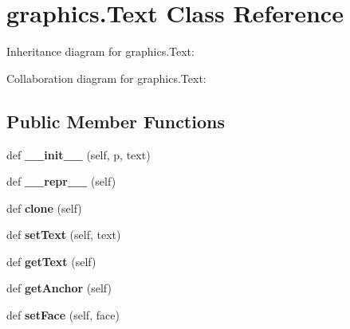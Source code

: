 \hypertarget{classgraphics_1_1Text}{}\section{graphics.\+Text Class Reference}
\label{classgraphics_1_1Text}


Inheritance diagram for graphics.\+Text\+:


Collaboration diagram for graphics.\+Text\+:
\subsection*{Public Member Functions}
\begin{DoxyCompactItemize}
\item 
def {\bfseries \+\_\+\+\_\+init\+\_\+\+\_\+} (self, p, text)\hypertarget{classgraphics_1_1Text_af17676ed39bcc03a78098b22a15ef591}{}\label{classgraphics_1_1Text_af17676ed39bcc03a78098b22a15ef591}

\item 
def {\bfseries \+\_\+\+\_\+repr\+\_\+\+\_\+} (self)\hypertarget{classgraphics_1_1Text_ae0b4ff4a08c45410d4f424a48a6eba59}{}\label{classgraphics_1_1Text_ae0b4ff4a08c45410d4f424a48a6eba59}

\item 
def {\bfseries clone} (self)\hypertarget{classgraphics_1_1Text_a507a4eea3a7a7de19bfe30ff70cf8fd6}{}\label{classgraphics_1_1Text_a507a4eea3a7a7de19bfe30ff70cf8fd6}

\item 
def {\bfseries set\+Text} (self, text)\hypertarget{classgraphics_1_1Text_ab8a97b69fe919acb98429b7da81b7d37}{}\label{classgraphics_1_1Text_ab8a97b69fe919acb98429b7da81b7d37}

\item 
def {\bfseries get\+Text} (self)\hypertarget{classgraphics_1_1Text_a1697a465c237e26532f43cef1af6abe5}{}\label{classgraphics_1_1Text_a1697a465c237e26532f43cef1af6abe5}

\item 
def {\bfseries get\+Anchor} (self)\hypertarget{classgraphics_1_1Text_a02525bc36e0af653d17905cd733d0843}{}\label{classgraphics_1_1Text_a02525bc36e0af653d17905cd733d0843}

\item 
def {\bfseries set\+Face} (self, face)\hypertarget{classgraphics_1_1Text_ae58860c5531b95e69136a819489a3169}{}\label{classgraphics_1_1Text_ae58860c5531b95e69136a819489a3169}


\end{DoxyCompactItemize}
